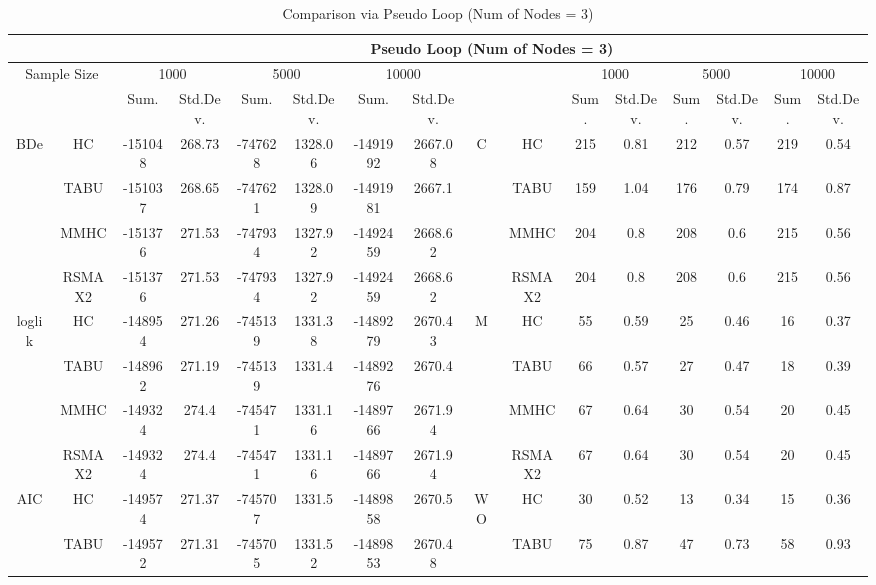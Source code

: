 \begin{table}[h]																										
\centering	\caption{Comparison via Pseudo Loop (Num of Nodes = 3)}	\tiny																						
{\tabcolsep=0.01in																										
\begin{tabular}{cc||cc|cc|cc||cc|cc|cc|cc}																										
\hline																										
&	&	\multicolumn{14}{c}{Pseudo Loop	(Num	of	Nodes	=	3)}\tabularnewline																			
\hline																										
\multicolumn{2}{c||}{Sample	Size}	&	\multicolumn{2}{c|}{1000}	&	\multicolumn{2}{c|}{5000}	&	\multicolumn{2}{c||}{10000}	&	&	&	\multicolumn{2}{c|}{1000}	&	\multicolumn{2}{c|}{5000}	&	\multicolumn{2}{c}{10000}\tabularnewline											
\hline																										
&	&	Sum.	&	Std.Dev.	&	Sum.	&	Std.Dev.	&	Sum.	&	Std.Dev.	&	&	&	Sum.	&	Std.Dev.	&	Sum.	&	Std.Dev.	&	Sum.	&	Std.Dev.\tabularnewline
\hline																										
\hline																										
\multirow{4}{*}{BDe} & HC &	-151048 & 	268.73 & 	-747628 & 	1328.06 & 	-1491992 & 	2667.08 & 	\multirow{4}{*}{C} & HC &	215 & 	0.81 & 	212 & 	0.57 & 	219 & 	0.54\tabularnewline													
& TABU &	-151037 & 	268.65 & 	-747621 & 	1328.09 & 	-1491981 & 	2667.1 & 	& TABU &	159 & 	1.04 & 	176 & 	0.79 & 	174 & 	0.87\tabularnewline													
& MMHC &	-151376 & 	271.53 & 	-747934 & 	1327.92 & 	-1492459 & 	2668.62 & 	& MMHC &	204 & 	0.8 & 	208 & 	0.6 & 	215 & 	0.56\tabularnewline													
& RSMAX2 &	-151376 & 	271.53 & 	-747934 & 	1327.92 & 	-1492459 & 	2668.62 & 	& RSMAX2 &	204 & 	0.8 & 	208 & 	0.6 & 	215 & 	0.56\tabularnewline													
\hline																										
\multirow{4}{*}{loglik} & HC &	-148954 & 	271.26 & 	-745139 & 	1331.38 & 	-1489279 & 	2670.43 & 	\multirow{4}{*}{M} & HC &	55 & 	0.59 & 	25 & 	0.46 & 	16 & 	0.37\tabularnewline													
& TABU &	-148962 & 	271.19 & 	-745139 & 	1331.4 & 	-1489276 & 	2670.4 & 	& TABU &	66 & 	0.57 & 	27 & 	0.47 & 	18 & 	0.39\tabularnewline													
& MMHC &	-149324 & 	274.4 & 	-745471 & 	1331.16 & 	-1489766 & 	2671.94 & 	& MMHC &	67 & 	0.64 & 	30 & 	0.54 & 	20 & 	0.45\tabularnewline													
& RSMAX2 &	-149324 & 	274.4 & 	-745471 & 	1331.16 & 	-1489766 & 	2671.94 & 	& RSMAX2 &	67 & 	0.64 & 	30 & 	0.54 & 	20 & 	0.45\tabularnewline													
\hline																										
\multirow{4}{*}{AIC} & HC &	-149574 & 	271.37 & 	-745707 & 	1331.5 & 	-1489858 & 	2670.5 & 	\multirow{4}{*}{WO} & HC &	30 & 	0.52 & 	13 & 	0.34 & 	15 & 	0.36\tabularnewline													
& TABU &	-149572 & 	271.31 & 	-745705 & 	1331.52 & 	-1489853 & 	2670.48 & 	& TABU &	75 & 	0.87 & 	47 & 	0.73 & 	58 & 	0.93\tabularnewline													

\end{tabular}}
\end{table}

